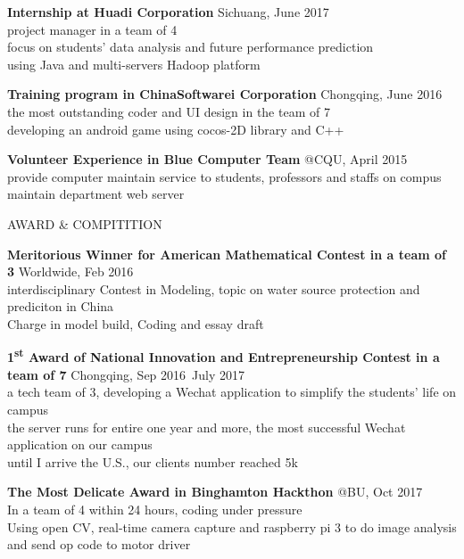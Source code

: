 \documentclass{article}
\begin{document}
\noindent
\textbf{Internship at Huadi Corporation}
\dotfill Sichuang, June 2017 \\
    \indent project manager in a team of 4 \\
    \indent focus on students' data analysis and future performance prediction \\
    \indent using Java and multi-servers Hadoop platform

\noindent
\textbf{Training program in ChinaSoftwarei Corporation}
\dotfill Chongqing, June 2016 \\
    \indent the most outstanding coder and UI design in the team of 7\\
    \indent developing an android game using cocos-2D library and C++

\noindent
\textbf{Volunteer Experience in Blue Computer Team}
\dotfill @CQU, April 2015 \\
    \indent provide computer maintain service to students, professors and staffs on compus \\
    \indent maintain department web server


\vskip 0.1in
\noindent
AWARD \& COMPITITION
\hrulefill

\noindent
\textbf{Meritorious Winner for American Mathematical Contest in a team of 3}
\href{}{\FA \faExternalLink} %
\dotfill Worldwide, Feb 2016 \\
    \indent interdisciplinary Contest in Modeling, topic on water source protection and prediciton in China\\
    \indent Charge in model build, Coding and essay draft

\noindent
\textbf{1\textsuperscript{st} Award of National Innovation and Entrepreneurship Contest in a team of 7}
\href{}{\FA \faExternalLink} %
\dotfill Chongqing, Sep 2016~July 2017 \\
    \indent a tech team of 3, developing a Wechat application to simplify the students' life on campus \\
    \indent the server runs for entire one year and more, the most successful Wechat application on our campus \\
    \indent until I arrive the U.S., our clients number reached 5k

\noindent
\textbf{The Most Delicate Award in Binghamton Hackthon}
\dotfill @BU, Oct 2017 \\
    \indent In a team of 4 within 24 hours, coding under pressure \\
    \indent Using open CV, real-time camera capture and raspberry pi 3 to do image analysis and send op code to motor driver
\end{document}

